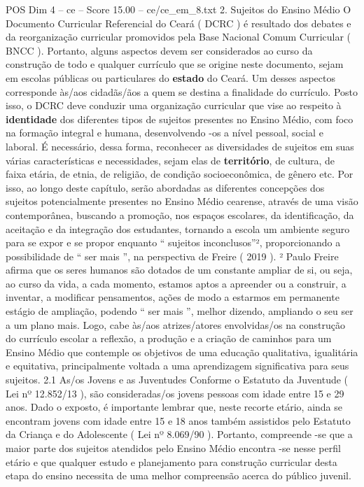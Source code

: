 \begin{textsample}{POS Dim 4 – ce – Score 15.00 – ce/ce\_em\_8.txt}  \label{ex:f4_pos_131}
2.
Sujeitos do Ensino Médio O Documento Curricular Referencial do Ceará ( DCRC ) é resultado dos debates e da reorganização curricular promovidos pela Base Nacional Comum Curricular ( BNCC ).
Portanto, alguns aspectos devem ser considerados ao curso da construção de todo e qualquer currículo que se origine neste documento, sejam em escolas públicas ou particulares do \textbf{estado} do Ceará.
Um desses aspectos corresponde às/aos cidadãs/ãos a quem se destina a finalidade do currículo.
Posto isso, o DCRC deve conduzir uma organização curricular que vise ao respeito à \textbf{identidade} dos diferentes tipos de sujeitos presentes no Ensino Médio, com foco na formação integral e humana, desenvolvendo -os a nível pessoal, social e laboral.
É necessário, dessa forma, reconhecer as diversidades de sujeitos em suas várias características e necessidades, sejam elas de \textbf{território}, de cultura, de faixa etária, de etnia, de religião, de condição socioeconômica, de gênero etc.
Por isso, ao longo deste capítulo, serão abordadas as diferentes concepções dos sujeitos potencialmente presentes no Ensino Médio cearense, através de uma visão contemporânea, buscando a promoção, nos espaços escolares, da identificação, da aceitação e da integração dos estudantes, tornando a escola um ambiente seguro para se expor e se propor enquanto “ sujeitos inconclusos”², proporcionando a possibilidade de “ ser mais ”, na perspectiva de Freire ( 2019 ). ² Paulo Freire afirma que os seres humanos são dotados de um constante ampliar de si, ou seja, ao curso da vida, a cada momento, estamos aptos a apreender ou a construir, a inventar, a modificar pensamentos, ações de modo a estarmos em permanente estágio de ampliação, podendo “ ser mais ”, melhor dizendo, ampliando o seu ser a um plano mais.
Logo, cabe às/aos atrizes/atores envolvidas/os na construção do currículo escolar a reflexão, a produção e a criação de caminhos para um Ensino Médio que contemple os objetivos de uma educação qualitativa, igualitária e equitativa, principalmente voltada a uma aprendizagem significativa para seus sujeitos. 2.1 As/os Jovens e as Juventudes Conforme o Estatuto da Juventude ( Lei nº 12.852/13 ), são consideradas/os jovens pessoas com idade entre 15 e 29 anos.
Dado o exposto, é importante lembrar que, neste recorte etário, ainda se encontram jovens com idade entre 15 e 18 anos também assistidos pelo Estatuto da Criança e do Adolescente ( Lei nº 8.069/90 ).
Portanto, compreende -se que a maior parte dos sujeitos atendidos pelo Ensino Médio encontra -se nesse perfil etário e que qualquer estudo e planejamento para construção curricular desta etapa do ensino necessita de uma melhor compreensão acerca do público juvenil.

\end{textsample}
